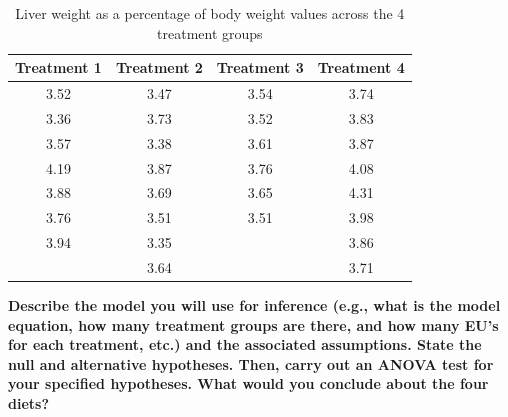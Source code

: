 \documentclass[10pt,twoside]{article}\usepackage[]{graphicx}\usepackage[dvipsnames,svgnames,table]{xcolor}
\newenvironment{knitrout}{}{} %
\begin{document}
\begin{enumerate}
\begin{knitrout}
\color{fgcolor}\begin{table}

\caption{\label{tab:rats}Liver weight as a percentage of body weight values across the 4 treatment groups}
\centering
\begin{tabular}[t]{cccc}
\toprule
Treatment 1 & Treatment 2 & Treatment 3 & Treatment 4\\
\midrule
3.52 & 3.47 & 3.54 & 3.74\\
3.36 & 3.73 & 3.52 & 3.83\\
3.57 & 3.38 & 3.61 & 3.87\\
4.19 & 3.87 & 3.76 & 4.08\\
3.88 & 3.69 & 3.65 & 4.31\\
3.76 & 3.51 & 3.51 & 3.98\\
3.94 & 3.35 &  & 3.86\\
 & 3.64 &  & 3.71\\
\bottomrule
\end{tabular}
\end{table}

\end{knitrout}

\textbf{Describe the model you will use for inference (e.g., what is the model equation, how many treatment groups are there, and how many EU's for each treatment, etc.) and the associated assumptions. State the null and alternative hypotheses. Then, carry out an ANOVA test for your specified hypotheses. 
What would you conclude about the four diets?
}

\end{enumerate}
\end{document}
